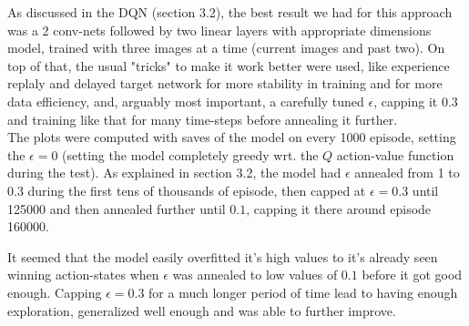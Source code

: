 As discussed in the DQN (section 3.2), the best result we had for this approach was a 2 conv-nets followed by two linear layers with appropriate dimensions model, trained with three images at a time (current images and past two). On top of that, the usual "tricks" to make it work better were used, like experience replaly and delayed target network for more stability in training and for more data efficiency, and, arguably most important, a carefully tuned $\epsilon$, capping it $0.3$ and training like that for many time-steps before annealing it further. \\


\medskip
\noindent
The plots were computed with saves of the model on every 1000 episode, setting the $\epsilon=0$ (setting the model completely greedy wrt. the $Q$ action-value function during the test). As explained in section 3.2, the model had $\epsilon$ annealed from 1 to 0.3 during the first tens of thousands of episode, then capped at $\epsilon=0.3$ until 125000 and then annealed further until $0.1$, capping it there around episode 160000.

\medskip
\noindent
It seemed that the model easily overfitted it's high values to it's already seen winning action-states when $\epsilon$ was annealed to low values of $0.1$ before it got good enough. Capping $\epsilon=0.3$ for a much longer period of time lead to having enough exploration, generalized well enough and was able to further improve.


